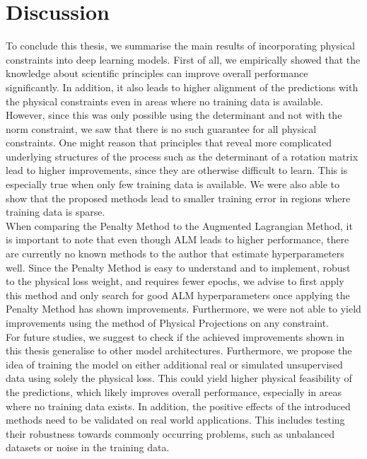 \label{section:discussion}
\section{Discussion}

To conclude this thesis, we summarise the main results of incorporating physical constraints into deep learning models. First of all, we empirically showed that the knowledge about scientific principles can improve overall performance significantly. In addition, it also leads to higher alignment of the predictions with the physical constraints even in areas where no training data is available. However, since this was only possible using the determinant and not with the norm constraint, we saw that there is no such guarantee for all physical constraints. One might reason that principles that reveal more complicated underlying structures of the process such as the determinant of a rotation matrix lead to higher improvements, since they are otherwise difficult to learn. This is especially true when only few training data is available. We were also able to show that the proposed methods lead to smaller training error in regions where training data is sparse.\\
\indent When comparing the Penalty Method to the Augmented Lagrangian Method, it is important to note that even though ALM leads to higher performance, there are currently no known methods to the author that estimate hyperparameters well. Since the Penalty Method is easy to understand and to implement, robust to the physical loss weight, and requires fewer epochs, we advise to first apply this method and only search for good ALM hyperparameters once applying the Penalty Method has shown improvements. Furthermore, we were not able to yield improvements using the method of Physical Projections on any constraint.\\
\indent For future studies, we suggest to check if the achieved improvements shown in this thesis generalise to other model architectures. Furthermore, we propose the idea of training the model on either additional real or simulated unsupervised data using solely the physical loss. This could yield higher physical feasibility of the predictions, which likely improves overall performance, especially in areas where no training data exists. In addition, the positive effects of the introduced methods need to be validated on real world applications. This includes testing their robustness towards commonly occurring problems, such as unbalanced datasets or noise in the training data.\\





\clearpage

